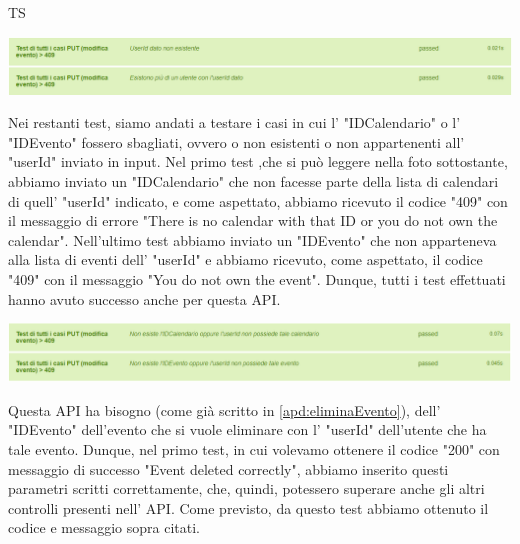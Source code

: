 \begin{listaPersonale}{TS}
                \begin{center}
                        \includegraphics[width=1\textwidth, height=0.08\textheight]{img/png/tests/EventoPut/409_userId_PutEvento.png}
                \end{center}
                Nei restanti test, siamo andati a testare i casi in cui l' "IDCalendario" o l' "IDEvento" fossero sbagliati, ovvero o non esistenti o non appartenenti all' "userId" inviato in input. Nel primo test ,che si può leggere nella foto sottostante, abbiamo inviato un "IDCalendario" che non facesse parte della lista di calendari di quell' "userId" indicato, e come aspettato, abbiamo ricevuto il codice "409" con il messaggio di errore "There is no calendar with that ID or you do not own the calendar". Nell'ultimo test abbiamo inviato un "IDEvento" che non apparteneva alla lista di eventi dell' "userId" e abbiamo ricevuto, come aspettato, il codice "409" con il messaggio "You do not own the event".  Dunque, tutti i test effettuati hanno avuto successo anche per questa API.
                \begin{center}
                        \includegraphics[width=1\textwidth, height=0.08\textheight]{img/png/tests/EventoPut/409_PutEvento.png}
                \end{center}
                Questa API ha bisogno (come già scritto in \ref{apd:eliminaEvento}), dell' "IDEvento" dell'evento  che si vuole eliminare con l' "userId" dell'utente che ha tale evento. Dunque, nel primo test, in cui volevamo ottenere il codice "200" con messaggio di successo "Event deleted correctly", abbiamo inserito questi parametri scritti correttamente, che, quindi, potessero superare anche gli altri controlli presenti nell' API. Come previsto, da questo test abbiamo ottenuto il codice e messaggio sopra citati.

\end{listaPersonale}

